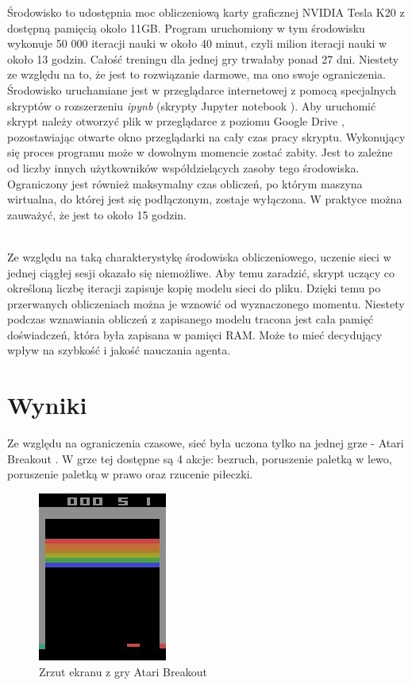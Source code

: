 \documentclass[12pt]{article}
\begin{document}
Środowisko to udostępnia moc obliczeniową karty graficznej NVIDIA Tesla K20 z dostępną pamięcią około 11GB. Program uruchomiony w tym środowisku wykonuje 50 000 iteracji nauki w około 40 minut, czyli milion iteracji nauki w około 13 godzin. Całość treningu dla jednej gry trwałaby ponad 27 dni. Niestety ze względu na to, że jest to rozwiązanie darmowe, ma ono swoje ograniczenia. Środowisko uruchamiane jest w przeglądarce internetowej z pomocą specjalnych skryptów o rozszerzeniu \textit{ipynb} (skrypty Jupyter notebook \cite{jupiter}). Aby uruchomić skrypt należy otworzyć plik w przeglądarce z poziomu Google Drive \cite{drive}, pozostawiając otwarte okno przeglądarki na cały czas pracy skryptu. Wykonujący się proces programu może w dowolnym momencie zostać zabity. Jest to zależne od liczby innych użytkowników współdzielących zasoby tego środowiska. Ograniczony jest również maksymalny czas obliczeń, po którym maszyna wirtualna, do której jest się podłączonym, zostaje wyłączona. W praktyce można zauważyć, że jest to około 15 godzin. 
\\\

Ze względu na taką charakterystykę środowiska obliczeniowego, uczenie sieci w jednej ciągłej sesji okazało się niemożliwe. Aby temu zaradzić, skrypt uczący co określoną liczbę iteracji zapisuje kopię modelu sieci do pliku. Dzięki temu po przerwanych obliczeniach można je wznowić od wyznaczonego momentu. Niestety podczas wznawiania obliczeń z zapisanego modelu tracona jest cała pamięć doświadczeń, która była zapisana w pamięci RAM. Może to mieć decydujący wpływ na szybkość i jakość nauczania agenta.


\section{Wyniki}
Ze względu na ograniczenia czasowe, sieć była uczona tylko na jednej grze - Atari Breakout \cite{breakout}. W grze tej dostępne są 4 akcje: bezruch, poruszenie paletką w lewo, poruszenie paletką w prawo oraz rzucenie piłeczki.

\begin{figure}[H]
\centering \includegraphics[scale=1]{1_raw.jpg}
\caption{Zrzut ekranu z gry Atari Breakout}
\label{atari1}
\end{figure}
\end{document}

